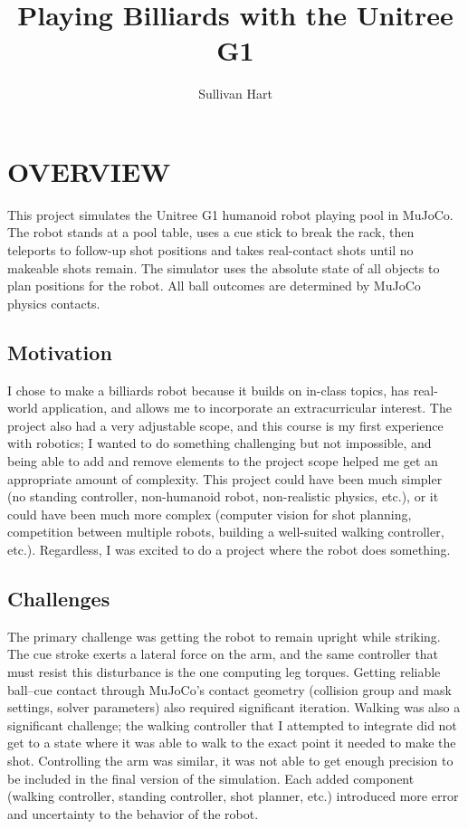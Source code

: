 \documentclass[letterpaper, 12 pt, conference]{ieeeconf}
\title{\LARGE \bf
Playing Billiards with the Unitree G1
}
\author{Sullivan Hart}
\begin{document}
\maketitle
\thispagestyle{empty}
\pagestyle{empty}

\section{OVERVIEW}

This project simulates the Unitree G1 humanoid robot playing pool in MuJoCo.
The robot stands at a pool table, uses a cue stick to break the rack, then teleports
to follow-up shot positions and takes real-contact shots until no makeable shots
remain. The simulator uses the absolute state of all objects to plan positions for the robot. All ball outcomes are determined by MuJoCo physics contacts.

\subsection{Motivation}

I chose to make a billiards robot because it builds on in-class topics, has real-world application, and allows me to incorporate an extracurricular interest. The project also had a very adjustable scope, and this course is my first experience with robotics; I wanted to do something challenging but not impossible, and being able to add and remove elements to the project scope helped me get an appropriate amount of complexity. This project could have been much simpler (no standing controller, non-humanoid robot, non-realistic physics, etc.), or it could have been much more complex (computer vision for shot planning, competition between multiple robots, building a well-suited walking controller, etc.). Regardless, I was excited to do a project where the robot does something.

\subsection{Challenges}
The primary challenge was getting the robot to remain upright while striking.
The cue stroke exerts a lateral force on the arm, and the same controller that
must resist this disturbance is the one computing leg torques. Getting reliable ball--cue contact through MuJoCo's contact
geometry (collision group and mask settings, solver parameters) also required
significant iteration. Walking was also a significant challenge; the walking controller that I attempted to integrate did not get to a state where it was able to walk to the exact point it needed to make the shot. Controlling the arm was similar, it was not able to get enough precision to be included in the final version of the simulation. Each added component (walking controller, standing controller, shot planner, etc.) introduced more error and uncertainty to the behavior of the robot.  
\end{document}
